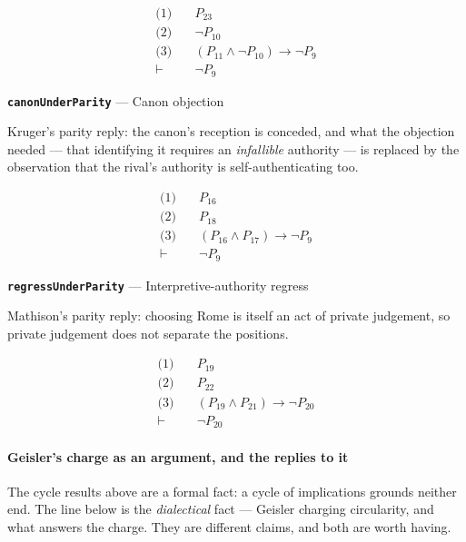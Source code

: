 \documentclass[11pt]{article}
\begin{document}
\begin{align*}
  \text{(1)} \quad & P_{23} \\
  \text{(2)} \quad & \lnot P_{10} \\
  \text{(3)} \quad & (P_{11} \land \lnot P_{10}) \rightarrow \lnot P_{9} \\
  \vdash \quad & \lnot P_{9}
\end{align*}
\par\medskip\noindent\textbf{\texttt{canon\allowbreak{}Under\allowbreak{}Parity}} --- Canon objection\par\nobreak\noindent
Kruger's parity reply: the canon's reception is conceded, and what the objection needed — that identifying it requires an \emph{infallible} authority — is replaced by the observation that the rival's authority is self-authenticating too.

\begin{align*}
  \text{(1)} \quad & P_{16} \\
  \text{(2)} \quad & P_{18} \\
  \text{(3)} \quad & (P_{16} \land P_{17}) \rightarrow \lnot P_{9} \\
  \vdash \quad & \lnot P_{9}
\end{align*}
\par\medskip\noindent\textbf{\texttt{regress\allowbreak{}Under\allowbreak{}Parity}} --- Interpretive-authority regress\par\nobreak\noindent
Mathison's parity reply: choosing Rome is itself an act of private judgement, so private judgement does not separate the positions.

\begin{align*}
  \text{(1)} \quad & P_{19} \\
  \text{(2)} \quad & P_{22} \\
  \text{(3)} \quad & (P_{19} \land P_{21}) \rightarrow \lnot P_{20} \\
  \vdash \quad & \lnot P_{20}
\end{align*}
\paragraph*{Geisler's charge as an argument, and the replies to it}
\leavevmode\par
The cycle results above are a formal fact: a cycle of implications grounds neither end. The line below is the \emph{dialectical} fact — Geisler charging circularity, and what answers the charge. They are different claims, and both are worth having.
\end{document}
